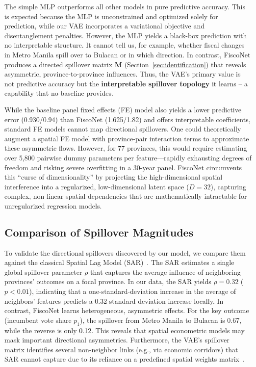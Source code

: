 \documentclass[conference]{IEEEtran}
\begin{document}
The simple MLP outperforms all other models in pure predictive accuracy. This is expected because the MLP is unconstrained and optimized solely for prediction, while our VAE incorporates a variational objective and disentanglement penalties. However, the MLP yields a black-box prediction with no interpretable structure. It cannot tell us, for example, whether fiscal changes in Metro Manila spill over to Bulacan or in which direction. In contrast, FiscoNet produces a directed spillover matrix $\mathbf{M}$ (Section~\ref{sec:identification}) that reveals asymmetric, province-to-province influences. Thus, the VAE’s primary value is not predictive accuracy but the \textbf{interpretable spillover topology} it learns – a capability that no baseline provides.

While the baseline panel fixed effects (FE) model also yields a lower predictive error (0.930/0.94) than FiscoNet (1.625/1.82) and offers interpretable coefficients, standard FE models cannot map directional spillovers. One could theoretically augment a spatial FE model with province-pair interaction terms to approximate these asymmetric flows. However, for 77 provinces, this would require estimating over 5,800 pairwise dummy parameters per feature—rapidly exhausting degrees of freedom and risking severe overfitting in a 30-year panel. FiscoNet circumvents this ``curse of dimensionality'' by projecting the high-dimensional spatial interference into a regularized, low-dimensional latent space ($D=32$), capturing complex, non-linear spatial dependencies that are mathematically intractable for unregularized regression models.

\subsection{Comparison of Spillover Magnitudes}
To validate the directional spillovers discovered by our model, we compare them against the classical Spatial Lag Model (SAR)~\cite{anselin1988spatial, lesage2009introduction}. The SAR estimates a single global spillover parameter $\rho$ that captures the average influence of neighboring provinces' outcomes on a focal province. In our data, the SAR yields $\rho = 0.32$ ($p<0.01$), indicating that a one-standard-deviation increase in the average of neighbors' features predicts a 0.32 standard deviation increase locally. In contrast, FiscoNet learns heterogeneous, asymmetric effects. For the key outcome (incumbent vote share $p_1$), the spillover from Metro Manila to Bulacan is 0.67, while the reverse is only 0.12. This reveals that spatial econometric models may mask important directional asymmetries. Furthermore, the VAE's spillover matrix identifies several non-neighbor links (e.g., via economic corridors) that SAR cannot capture due to its reliance on a predefined spatial weights matrix~\cite{burridge2011research}.
\end{document}
